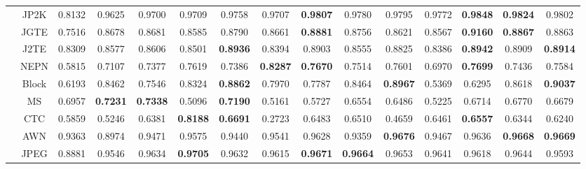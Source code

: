 \begin{table*}[htb]
\begin{tabular}{ccccccccccccccc}
                      & JP2K  & 0.8132          & 0.9625          & 0.9700          & 0.9709          & 0.9758          & 0.9707          & \textbf{0.9807} & 0.9780          & 0.9795          & 0.9772          & \textbf{0.9848} & \textbf{0.9824} & 0.9802                     \\
                      & JGTE  & 0.7516          & 0.8678          & 0.8681          & 0.8585          & 0.8790          & 0.8661          & \textbf{0.8881} & 0.8756          & 0.8621          & 0.8567          & \textbf{0.9160} & \textbf{0.8867} & 0.8863                     \\
                      & J2TE  & 0.8309          & 0.8577          & 0.8606          & 0.8501          & \textbf{0.8936} & 0.8394          & 0.8903          & 0.8555          & 0.8825          & 0.8386          & \textbf{0.8942} & 0.8909 & \textbf{0.8914}                     \\
                      & NEPN  & 0.5815          & 0.7107          & 0.7377          & 0.7619          & 0.7386          & \textbf{0.8287} & \textbf{0.7670}          & 0.7514          & 0.7601          & 0.6970          & \textbf{0.7699} & 0.7436 & 0.7584                              \\
                      & Block & 0.6193          & 0.8462          & 0.7546          & 0.8324          & \textbf{0.8862} & 0.7970          & 0.7787          & 0.8464          & \textbf{0.8967} & 0.5369          & 0.6295          & 0.8618 & \textbf{0.9037}                     \\
                      & MS    & 0.6957          & \textbf{0.7231} & \textbf{0.7338} & 0.5096          & \textbf{0.7190} & 0.5161          & 0.5727          & 0.6554          & 0.6486          & 0.5225          & 0.6714          & 0.6770 & 0.6679                              \\
                      & CTC   & 0.5859          & 0.5246          & 0.6381          & \textbf{0.8188} & \textbf{0.6691} & 0.2723          & 0.6483          & 0.6510          & 0.4659          & 0.6461          & \textbf{0.6557} & 0.6344 & 0.6240                              \\ \hline
                      & AWN  & 0.9363          & 0.8974          & 0.9471          & 0.9575          & 0.9440          & 0.9541          & 0.9628          & 0.9359          & \textbf{0.9676} & 0.9467          & 0.9636 & \textbf{0.9668} & \textbf{0.9669}                     \\
                      & JPEG  & 0.8881          & 0.9546          & 0.9634          & \textbf{0.9705} & 0.9632          & 0.9615          & \textbf{0.9671} & \textbf{0.9664} & 0.9653          & 0.9641          & 0.9618          & 0.9644 & 0.9593                              \\

\end{tabular}
\end{table*}
